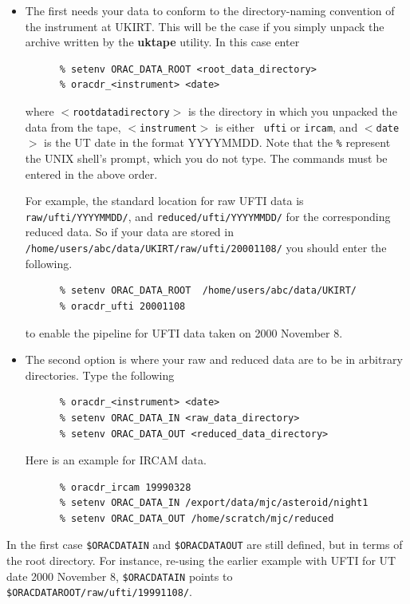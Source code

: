 \documentclass[twoside,11pt]{article}
\renewcommand{\_}{\texttt{\symbol{95}}}
\begin{document}
\begin{itemize}

\item  The first needs your data to conform to the directory-naming
convention of the instrument at UKIRT.  This will be the case if you
simply unpack the archive written by the {\bf uktape} utility.  In
this case enter

\begin{verbatim}
      % setenv ORAC_DATA_ROOT <root_data_directory>
      % oracdr_<instrument> <date>
\end{verbatim}
where {\tt $<$root\_data\_directory$>$} is the directory in which you
unpacked the data from the tape, {\tt $<$instrument$>$} is either {\tt
ufti} or {\tt ircam}, and {\tt$<$date$>$} is the UT date in the format
YYYYMMDD.  Note that the \texttt{\%} represent the UNIX shell's
prompt, which you do not type.  The commands must be entered in the
above order.  

For example, the standard location for raw UFTI data is {\tt
raw/ufti/YYYYMMDD/}, and {\tt reduced/ufti/YYYYMMDD/} for the
corresponding reduced data.  So if your data are stored in {\tt
/home/users/abc/data/UKIRT/raw/ufti/20001108/} you should enter the
following.

\begin{verbatim}
      % setenv ORAC_DATA_ROOT  /home/users/abc/data/UKIRT/
      % oracdr_ufti 20001108
\end{verbatim}
to enable the pipeline for UFTI data taken on 2000 November 8.

\item The second option is where your raw and reduced data are to be
in arbitrary directories.  Type the following

\begin{verbatim}
      % oracdr_<instrument> <date>
      % setenv ORAC_DATA_IN <raw_data_directory>
      % setenv ORAC_DATA_OUT <reduced_data_directory>
\end{verbatim}

Here is an example for IRCAM data.
\begin{verbatim}
      % oracdr_ircam 19990328
      % setenv ORAC_DATA_IN /export/data/mjc/asteroid/night1
      % setenv ORAC_DATA_OUT /home/scratch/mjc/reduced
\end{verbatim}

\end{itemize}
In the first case {\tt \$ORAC\_DATA\_IN} and {\tt \$ORAC\_DATA\_OUT} are
still defined, but in terms of the root directory.  For instance, re-using
the earlier example with UFTI for UT date 2000 November 8,
{\tt \$ORAC\_DATA\_IN} points to {\tt \$ORAC\_DATA\_ROOT/raw/ufti/19991108/}.
\end{document}
